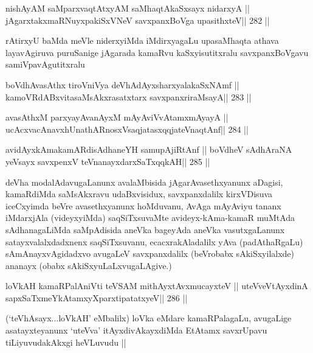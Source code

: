 \begin{shl}
nishAyAM saMparxvaqtAtxyAM saMhaqtAkaSxsayx nidarxyA ||
jAgarxtakxmaRNuyxpakiSxVNeV savxpanxBoVga upasithxteV\hfill || 282 ||
\end{shl}

\begin{artha}
rAtirxyU baMda meVle niderxyiMda iMdirxyagaLu upasaMhaqta athava layavAgiruva puruSanige jAgarada kamaRvu kaSxyisutitxralu savxpanxBoVgavu samiVpavAgutitxralu 
\end{artha}

\begin{shl}
boVdhAvasAthx tiroVniVya deVhAdAyxsharxyalakaSxNAmf ||
kamoVRdABxvitasaMsAkxrasatxtarx savxpanxriraMsayA\hfill || 283 ||
\end{shl}

\begin{shl}
avasAthxM parxyayAvanAyxM mAyAviVvA\s\s tamxmAyayA ||
ucAcxvacAnavxhUnathARnosxV\s saqjatasxqqjateV\s naqtAnf\hfill || 284 ||
\end{shl}

\begin{shl}
avidAyxkAmakamARdisAdhaneYH samupAjiRtAnf ||
boVdheV sAdhAraNA yeV\s sayx savxpenxV teV\s nanayxdarxSaTxqqkAH\hfill || 285 ||
\end{shl}

\begin{artha}
deVha modalAdavugaLanunx avalaMbisida jAgarAvasethxyanunx aDagisi, kamaRdiMda saMsAkxravu udaBxvisidux, savxpanxdalilx kirxVDisuva iceCxyimda beVre avasethxyanunx hoMduvanu, AvAga mAyAviyu tananx iMdarxjAla (videyxyiMda) saqSiTxsuvaMte avideyx-kAma-kamaR muMtAda sAdhanagaLiMda saMpAdisida aneVka bageyAda aneVka vasutxgaLanunx satayxvalalxdadxnenx saqSiTxsuvanu, ecacxrakAladalilx yAva (padAthaRgaLu) sAmAnayxvAgidadxvo avugaLeV savxpanxdalilx (beVrobabx sAkiSxyilalxde) ananayx (obabx sAkiSxyuLaLxvugaLAgive.)
\end{artha}

\begin{shl}
loVkAH kamaRPalAniVti teVSAM mithAyxtAvxmucayxteV ||
uteVveVtAyxdinA sapxSaTxmeYkAtamxyXparxtipatatxyeV\hfill || 286 ||
\end{shl}

\begin{artha}
(`teVhAsayx...loVkAH' eMbalilx) loVka eMdare kamaRPalagaLu, avugaLige asatayxteyanunx `uteVva' itAyxdivAkayxdiMda EtAtamx savxrUpavu tiLiyuvudakAkxgi heVLuvudu ||
\end{artha}

